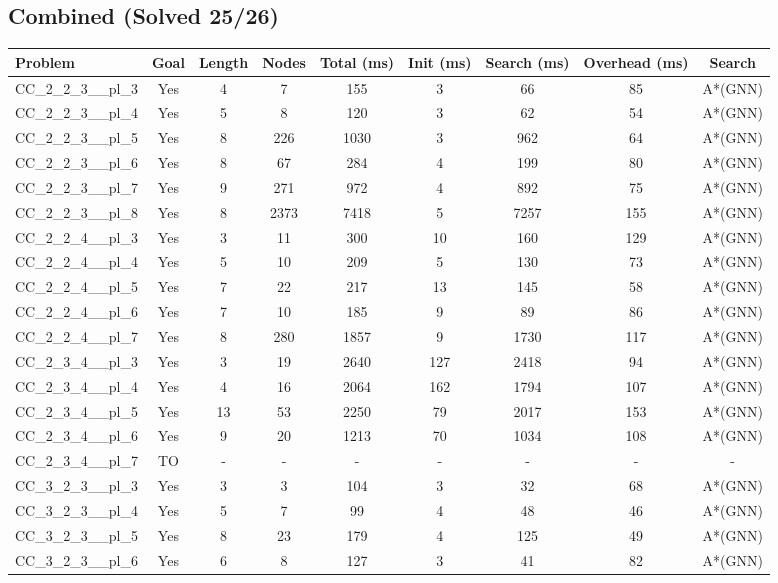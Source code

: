 \documentclass{article}
\begin{document}
\subsection*{Combined (Solved 25/26)}
\begin{tabular}{lcccccccc}
\toprule
Problem & Goal & Length & Nodes & Total (ms) & Init (ms) & Search (ms) & Overhead (ms) & Search \\
\midrule
CC\_2\_2\_3\_\_pl\_3 & Yes & 4 & 7 & 155 & 3 & 66 & 85 & A*(GNN) \\
CC\_2\_2\_3\_\_pl\_4 & Yes & 5 & 8 & 120 & 3 & 62 & 54 & A*(GNN) \\
CC\_2\_2\_3\_\_pl\_5 & Yes & 8 & 226 & 1030 & 3 & 962 & 64 & A*(GNN) \\
CC\_2\_2\_3\_\_pl\_6 & Yes & 8 & 67 & 284 & 4 & 199 & 80 & A*(GNN) \\
CC\_2\_2\_3\_\_pl\_7 & Yes & 9 & 271 & 972 & 4 & 892 & 75 & A*(GNN) \\
CC\_2\_2\_3\_\_pl\_8 & Yes & 8 & 2373 & 7418 & 5 & 7257 & 155 & A*(GNN) \\
CC\_2\_2\_4\_\_pl\_3 & Yes & 3 & 11 & 300 & 10 & 160 & 129 & A*(GNN) \\
CC\_2\_2\_4\_\_pl\_4 & Yes & 5 & 10 & 209 & 5 & 130 & 73 & A*(GNN) \\
CC\_2\_2\_4\_\_pl\_5 & Yes & 7 & 22 & 217 & 13 & 145 & 58 & A*(GNN) \\
CC\_2\_2\_4\_\_pl\_6 & Yes & 7 & 10 & 185 & 9 & 89 & 86 & A*(GNN) \\
CC\_2\_2\_4\_\_pl\_7 & Yes & 8 & 280 & 1857 & 9 & 1730 & 117 & A*(GNN) \\
CC\_2\_3\_4\_\_pl\_3 & Yes & 3 & 19 & 2640 & 127 & 2418 & 94 & A*(GNN) \\
CC\_2\_3\_4\_\_pl\_4 & Yes & 4 & 16 & 2064 & 162 & 1794 & 107 & A*(GNN) \\
CC\_2\_3\_4\_\_pl\_5 & Yes & 13 & 53 & 2250 & 79 & 2017 & 153 & A*(GNN) \\
CC\_2\_3\_4\_\_pl\_6 & Yes & 9 & 20 & 1213 & 70 & 1034 & 108 & A*(GNN) \\
CC\_2\_3\_4\_\_pl\_7 & TO & - & - & - & - & - & - & - \\
CC\_3\_2\_3\_\_pl\_3 & Yes & 3 & 3 & 104 & 3 & 32 & 68 & A*(GNN) \\
CC\_3\_2\_3\_\_pl\_4 & Yes & 5 & 7 & 99 & 4 & 48 & 46 & A*(GNN) \\
CC\_3\_2\_3\_\_pl\_5 & Yes & 8 & 23 & 179 & 4 & 125 & 49 & A*(GNN) \\
CC\_3\_2\_3\_\_pl\_6 & Yes & 6 & 8 & 127 & 3 & 41 & 82 & A*(GNN) \\

\end{tabular}
\end{document}
